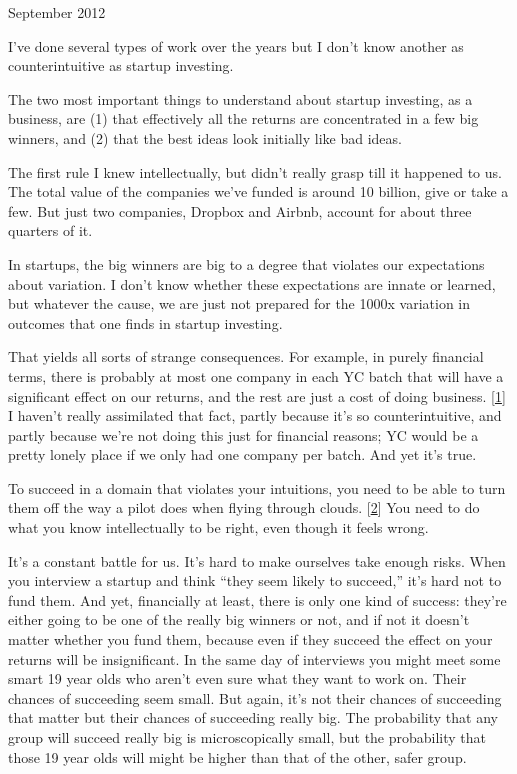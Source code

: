 September 2012

I've done several types of work over the years but I don't know another
as counterintuitive as startup investing.

The two most important things to understand about startup investing, as
a business, are (1) that effectively all the returns are concentrated in
a few big winners, and (2) that the best ideas look initially like bad
ideas.

The first rule I knew intellectually, but didn't really grasp till it
happened to us. The total value of the companies we've funded is around
10 billion, give or take a few. But just two companies, Dropbox and
Airbnb, account for about three quarters of it.

In startups, the big winners are big to a degree that violates our
expectations about variation. I don't know whether these expectations
are innate or learned, but whatever the cause, we are just not prepared
for the 1000x variation in outcomes that one finds in startup investing.

That yields all sorts of strange consequences. For example, in purely
financial terms, there is probably at most one company in each YC batch
that will have a significant effect on our returns, and the rest are
just a cost of doing business. {[}\hyperref[f1n]{1}{]} I haven't really
assimilated that fact, partly because it's so counterintuitive, and
partly because we're not doing this just for financial reasons; YC would
be a pretty lonely place if we only had one company per batch. And yet
it's true.

To succeed in a domain that violates your intuitions, you need to be
able to turn them off the way a pilot does when flying through clouds.
{[}\hyperref[f2n]{2}{]} You need to do what you know intellectually to
be right, even though it feels wrong.

It's a constant battle for us. It's hard to make ourselves take enough
risks. When you interview a startup and think ``they seem likely to
succeed,'' it's hard not to fund them. And yet, financially at least,
there is only one kind of success: they're either going to be one of the
really big winners or not, and if not it doesn't matter whether you fund
them, because even if they succeed the effect on your returns will be
insignificant. In the same day of interviews you might meet some smart
19 year olds who aren't even sure what they want to work on. Their
chances of succeeding seem small. But again, it's not their chances of
succeeding that matter but their chances of succeeding really big. The
probability that any group will succeed really big is microscopically
small, but the probability that those 19 year olds will might be higher
than that of the other, safer group.

